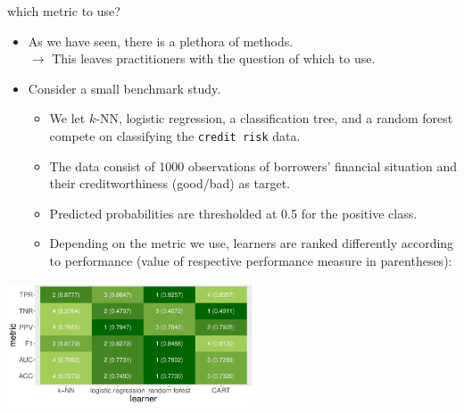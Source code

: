 \documentclass[11pt,compress,t,notes=noshow, xcolor=table]{beamer}
\begin{document}

\begin{vbframe}{which metric to use?}

\begin{itemize}
  \footnotesize
  \item As we have seen, there is a plethora of methods. \\
  $\rightarrow$ This leaves practitioners with the question of which to use.
  \item Consider a small benchmark study.
  \begin{itemize}
    \footnotesize
    \item We let $k$-NN, logistic regression, a classification tree, and a random 
    forest compete on classifying the \texttt{credit risk} data.
    \item The data consist of 1000 observations of borrowers' financial 
    situation and their creditworthiness (good/bad) as target.
    \item Predicted probabilities are thresholded at 0.5 for the positive class.
    \item Depending on the metric we use, learners are ranked differently 
    according to performance (value of respective performance measure in 
    parentheses):
  \end{itemize}
\end{itemize}

\begin{center}
\includegraphics[width=0.55\textwidth]{figure/eval_mclass_benchmark.pdf}
\end{center}

\framebreak


\end{vbframe}
\end{document}
